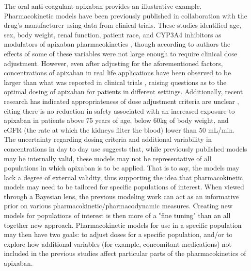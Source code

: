 The oral anti-coagulant apixaban provides an illustrative example.  Pharmacokinetic models have been previously published \cite{cirincione2018population,ueshima2018population} in collaboration with the drug's manufacturer using data from clinical trials.  These studies identified age, sex, body weight, renal function,  patient race, and CYP3A4 inhibitors as modulators of apixaban pharmacokinetics \cite{cirincione2018population}, though according to authors the effects of some of these variables were not large enough to require clinical dose adjustment. However, even after adjusting for the aforementioned factors, concentrations of apixaban in real life applications have been observed to be larger than what was reported in clinical trials \cite{sukumar2019apixaban}, raising questions as to the optimal dosing of apixaban for patients in different settings. Additionally, recent research has indicated appropriateness of dose adjustment criteria are unclear \cite{vu2021critical}, citing there is no reduction in safety associated with an increased exposure to apixaban in patients above 75 years of age, below 60kg of body weight, and eGFR (the rate at which the kidneys filter the blood) lower than 50 mL/min. The uncertainty regarding dosing criteria and additional variability in concentrations in day to day use suggests that, while previously published models may be internally valid, these models may not be representative of all populations in which apixaban is to be applied.  That is to say, the models may lack a degree of external validity, thus supporting the idea that pharmacokinetic models may need to be tailored for specific populations of interest. When viewed through a Bayesian lens, the previous modeling work can act as an informative prior on various pharmacokinetic/pharmacodynamic measures.  Creating new models for populations of interest is then more of a "fine tuning" than an all together new approach.  Pharmacokinetic models for use in a specific population may then have two goals:  to adjust doses for a specific population, and/or to explore how additional variables (for example, concomitant medications) not included in the previous studies affect particular parts of the pharmacokinetics of apixaban.  

